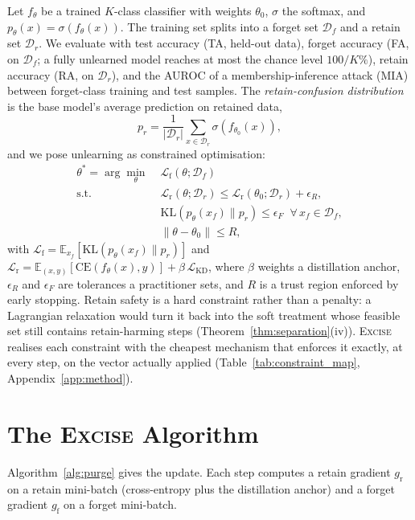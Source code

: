 \documentclass{article}
\newcommand{\ours}{\textsc{Excise}}
\newcommand{\KL}{\mathrm{KL}}
\newcommand{\CE}{\mathrm{CE}}
\newcommand{\Df}{\mathcal{D}_f}
\newcommand{\Dr}{\mathcal{D}_r}
\newcommand{\gf}{g_{\mathrm{f}}}
\newcommand{\gr}{g_{\mathrm{r}}}
\newcommand{\lossf}{\mathcal{L}_{\mathrm{f}}}
\newcommand{\lossr}{\mathcal{L}_{\mathrm{r}}}
\newcommand{\losskd}{\mathcal{L}_{\mathrm{KD}}}
\theoremstyle{remark}
\theoremstyle{plain}
\begin{document}
Let $f_\theta$ be a trained $K$-class classifier with weights $\theta_0$,
$\sigma$ the softmax, and $p_\theta(x) = \sigma(f_\theta(x))$. The training set
splits into a forget set $\Df$ and a retain set $\Dr$. We evaluate with test
accuracy (TA, held-out data), forget accuracy (FA, on $\Df$; a fully unlearned
model reaches at most the chance level $100/K\%$), retain accuracy (RA, on
$\Dr$), and the AUROC of a membership-inference attack (MIA) between forget-class
training and test samples. The \emph{retain-confusion distribution} is the base
model's average prediction on retained data,
\begin{equation}\label{eq:retain_confuse}
p_r = \frac{1}{|\Dr|}\sum_{x \in \Dr} \sigma(f_{\theta_0}(x)),
\end{equation}
and we pose unlearning as constrained optimisation:
\begin{equation}\label{eq:problem}
\begin{aligned}
\theta^* = \arg\min_{\theta}\; & \lossf(\theta;\Df) \\
\text{s.t.}\quad & \lossr(\theta;\Dr) \le \lossr(\theta_0;\Dr) + \epsilon_R, \\
& \KL(p_\theta(x_f) \| p_r) \le \epsilon_F \;\;\forall\, x_f \in \Df, \\
& \|\theta - \theta_0\| \le R,
\end{aligned}
\end{equation}
with $\lossf = \mathbb{E}_{x_f}[\KL(p_\theta(x_f)\|p_r)]$ and
$\lossr = \mathbb{E}_{(x,y)}[\CE(f_\theta(x),y)] + \beta\,\losskd$, where $\beta$
weights a distillation anchor, $\epsilon_R$ and $\epsilon_F$ are tolerances a
practitioner sets, and $R$ is a trust region enforced by early stopping. Retain
safety is a hard constraint rather than a penalty: a Lagrangian relaxation would
turn it back into the soft treatment whose feasible set still contains
retain-harming steps (Theorem~\ref{thm:separation}(iv)). \ours{} realises each
constraint with the cheapest mechanism that enforces it exactly, at every step,
on the vector actually applied (Table~\ref{tab:constraint_map},
Appendix~\ref{app:method}).

\section{The \ours{} Algorithm}\label{sec:method}

Algorithm~\ref{alg:purge} gives the update. Each step computes a retain gradient
$\gr$ on a retain mini-batch (cross-entropy plus the distillation anchor) and a
forget gradient $\gf$ on a forget mini-batch.
\end{document}
